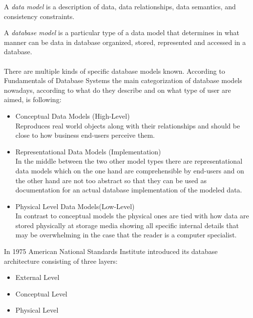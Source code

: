 \par
A \textit{data model} is a description of data, data relationships, data semantics, and consistency constraints. \\
\par
A \textit{database model} is a particular type of a data model that determines in what manner can be data in database organized, stored, represented and accessed in a database.
\\
\\
There are multiple kinds of specific database models known.
According to Fundamentals of Database Systems \cite{SilberschatzKorthSudarshan10} the main categorization of database models nowadays, according to what do they describe and on what type of user are aimed, is following:
\begin{itemize}
	\item Conceptual Data Models (High-Level) \\
		Reproduces real world objects along with their relationships and should be close to how business end-users perceive them.
	
	\item Representational Data Models (Implementation) \\
		In the middle between the two other model types there are representational data models which on the one hand are comprehensible by end-users and on the other hand are not too abstract so that they can be used as documentation for an actual database implementation of the modeled data.
	
	\item Physical Level Data Models(Low-Level) \\
		 In contrast to conceptual models the physical ones are tied with how data are stored physically at storage media showing all specific internal details that may be overwhelming in the case that the reader is a computer specialist.
\end{itemize}



In 1975 American National Standards Institute \cite{ANSIArchitecture75} introduced its database architecture consisting of three layers:
\begin{itemize}
	\item  External Level
	\item Conceptual Level
	\item Physical Level
\end{itemize}


